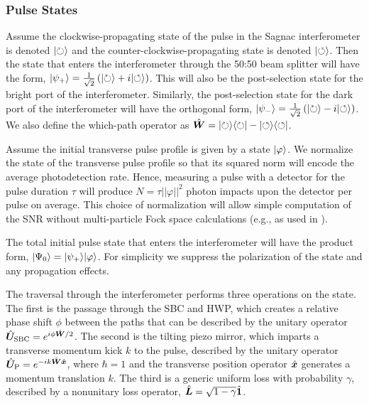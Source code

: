 \subsubsection{Pulse States}
Assume the clockwise-propagating state of the pulse in the Sagnac interferometer is denoted $\lvert \circlearrowright\rangle$ and the counter-clockwise-propagating state is denoted $\lvert \circlearrowleft\rangle$.  Then the state that enters the interferometer through the 50:50 beam splitter will have the form, $\lvert \psi_+\rangle = \frac{1}{\sqrt{2}}\left( \lvert \circlearrowright\rangle + i \lvert \circlearrowleft\rangle \right)$.  This will also be the post-selection state for the bright port of the interferometer.  Similarly, the post-selection state for the dark port of the interferometer will have the orthogonal form, $\lvert \psi_-\rangle = \frac{1}{\sqrt{2}}\left( \lvert \circlearrowright\rangle - i \lvert \circlearrowleft\rangle \right)$.  We also define the which-path operator as $\hat{\bm W} = \lvert \circlearrowright\rangle\langle \circlearrowright \rvert - \lvert \circlearrowleft\rangle\langle \circlearrowleft \rvert$.

Assume the initial transverse pulse profile is given by a state $\lvert \varphi\rangle$.  We normalize the state of the transverse pulse profile so that its squared norm will encode the average photodetection rate.  Hence, measuring a pulse with a detector for the pulse duration $\tau$ will produce $N = \tau||\varphi||^2$ photon impacts upon the detector per pulse on average.  This choice of normalization will allow simple computation of the SNR without multi-particle Fock space calculations (e.g., as used in \cite{Barnett2003}).  

The total initial pulse state that enters the interferometer will have the product form, $\lvert \Psi_0\rangle = \lvert \psi_+\rangle\lvert \varphi\rangle$.  For simplicity we suppress the polarization of the state and any propagation effects.

The traversal through the interferometer performs three operations on the state.  The first is the passage through the SBC and HWP, which creates a relative phase shift $\phi$ between the paths that can be described by the unitary operator $\hat{\bm U}_{\text{SBC}} = e^{i \phi \hat{\bm W} / 2}$.  The second is the tilting piezo mirror, which imparts a transverse momentum kick $k$ to the pulse, described by the unitary operator $\hat{\bm U}_{\text{P}} = e^{-i k \hat{\bm W}\hat{\bm x}}$, where $\hbar = 1$ and the transverse position operator $\hat{\bm x}$ generates a momentum translation $k$.  The third is a generic uniform loss with probability $\gamma$, described by a nonunitary loss operator, $\hat{\bm L} = \sqrt{1-\gamma}\hat{\bm 1}$.  

